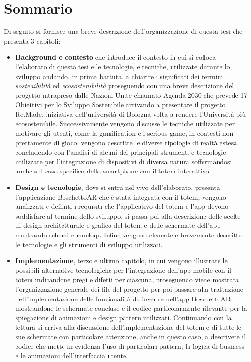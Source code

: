 \section*{Sommario}
Di seguito si fornisce una breve descrizione dell'organizzazione di questa tesi che presenta 3 capitoli: 
\begin{itemize}
    \itemsep1em
    \item \textbf{Background e contesto} che introduce il contesto in cui si colloca l'elaborato di questa tesi e le tecnologie, e tecniche, utilizzate durante lo sviluppo andando, in prima battuta, a chiarire i significati dei termini \textit{sostenibilità} ed \textit{ecosostenibilità} proseguendo con una breve descrizione del progetto intrapreso dalle Nazioni Unite chiamato Agenda 2030 che prevede 17 Obiettivi per lo Sviluppo Sostenibile arrivando a presentare il progetto Re.Made, iniziativa dell'università di Bologna volta a rendere l'Università più ecosostenibile.
    Successivamente vengono discusse le tecniche utilizzate per motivare gli utenti, come la gamification e i serious game, in contesti non prettamente di gioco, vengono descritte le diverse tipologie di realtà estesa concludendo con l'analisi di alcuni dei principali strumenti e tecnologie utilizzate per l'integrazione di dispositivi di diversa natura soffermandosi anche sul caso specifico dello smartphone con il totem interattivo.
    \item \textbf{Design e tecnologie}, dove si entra nel vivo dell'elaborato, presenta l'applicazione BoschettoAR che è stata integrata con il totem, vengono analizzati e definiti i requisiti che l'applicativo del totem e l'app devono soddisfare al termine dello sviluppo, si passa poi alla descrizione delle scelte di design architetturale e grafico del totem e delle schermate dell'app mostrando schemi e mockup. Infine vengono elencate e brevemente descritte le tecnologie e gli strumenti di sviluppo utilizzati.
    \item \textbf{Implementazione}, terzo e ultimo capitolo, in cui vengono illustrate le possibili alternative tecnologiche per l'integrazione dell'app mobile con il totem indicandone pregi e difetti per ciascuna, proseguendo viene mostrata l'organizzazione generale dei file del progetto per poi passare alla trattazione dell'implementazione delle funzionalità da inserire nell'app BoschettoAR mostrandone le schermate concluse e il codice particolarmente rilevante per la spiegazione di animazioni e design pattern utilizzati. Continuando con la lettura si arriva alla discussione dell'implementazione del totem e di tutte le sue schermate con particolare attenzione, anche in questo caso, a descrivere il codice che mette in evidenza l'uso di particolari pattern, la logica di business e le animazioni dell'interfaccia utente.
\end{itemize}